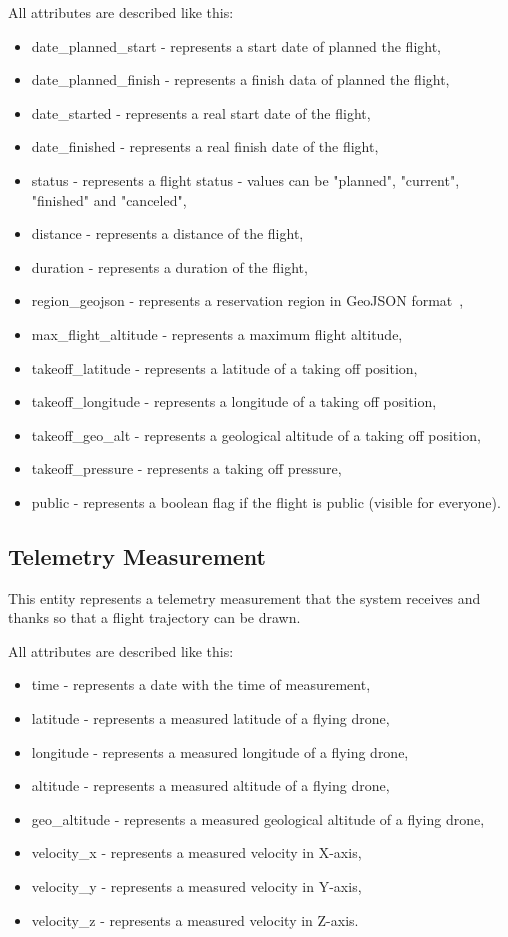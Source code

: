 All attributes are described like this:
\begin{itemize}
    \item date\_planned\_start - represents a start date of planned the flight,
    \item date\_planned\_finish - represents a finish data of planned the flight,
    \item date\_started - represents a real start date of the flight,
    \item date\_finished - represents a real finish date of the flight,
    \item status - represents a flight status - values can be "planned", "current", "finished" and "canceled",
    \item distance - represents a distance of the flight,
    \item duration - represents a duration of the flight,
    \item region\_geojson - represents a reservation region in GeoJSON format~\cite{geoJson},
    \item max\_flight\_altitude - represents a maximum flight altitude,
    \item takeoff\_latitude - represents a latitude of a taking off position,
    \item takeoff\_longitude - represents a longitude of a taking off position,
    \item takeoff\_geo\_alt - represents a geological altitude of a taking off position,
    \item takeoff\_pressure - represents a taking off pressure,
    \item public - represents a boolean flag if the flight is public (visible for everyone).
\end{itemize}

\subsection{Telemetry Measurement}\label{subsec:telemetry-measurement}
This entity represents a telemetry measurement that the system receives and thanks so that a flight trajectory can be drawn.

All attributes are described like this:
\begin{itemize}
    \item time - represents a date with the time of measurement,
    \item latitude - represents a measured latitude of a flying drone,
    \item longitude - represents a measured longitude of a flying drone,
    \item altitude - represents a measured altitude of a flying drone,
    \item geo\_altitude - represents a measured geological altitude of a flying drone,
    \item velocity\_x - represents a measured velocity in X-axis,
    \item velocity\_y - represents a measured velocity in Y-axis,
    \item velocity\_z - represents a measured velocity in Z-axis.
\end{itemize}

